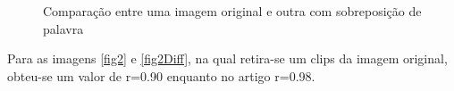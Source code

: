 \documentclass[10pt,a4paper]{article}
\begin{document}
\begin{figure}[h!]
\begin{center}
\caption{Comparação entre uma imagem original e outra com sobreposição
  de palavra}
\end{center}
\end{figure}

Para as imagens \ref{fig2} e \ref{fig2Diff}, na qual retira-se um
clips da imagem original, obteu-se um valor de r=0.90
enquanto no artigo r=0.98.
\end{document}
